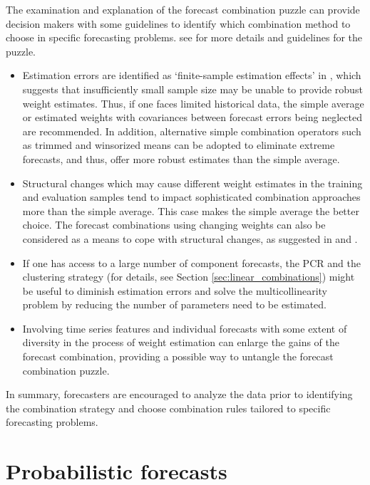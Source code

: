 \documentclass[11pt]{article}
\begin{document}
The examination and explanation of the forecast combination puzzle can provide decision makers with some guidelines to identify which combination method to choose in specific forecasting problems. {\color{red}see \cite{Blanc2016-sn} for more details and guidelines for the puzzle.}
\begin{itemize}
  \item Estimation errors are identified as `finite-sample estimation effects' in \cite{Smith2009-wd}, which suggests that insufficiently small sample size may be unable to provide robust weight estimates. Thus, if one faces limited historical data, the simple average or estimated weights with covariances between forecast errors being neglected are recommended. In addition, alternative simple combination operators such as trimmed and winsorized means can be adopted to eliminate extreme forecasts, and thus, offer more robust estimates than the simple average.
  \item Structural changes which may cause different weight estimates in the training and evaluation samples tend to impact sophisticated combination approaches more than the simple average. This case makes the simple average the better choice. The forecast combinations using changing weights can also be considered as a means to cope with structural changes, as suggested in \cite{Diebold1987-go} and \cite{Deutsch1994-ob}.
  \item If one has access to a large number of component forecasts, the PCR and the clustering strategy (for details, see Section \ref{sec:linear_combinations}) might be useful to diminish estimation errors and solve the multicollinearity problem by reducing the number of parameters need to be estimated.
  \item Involving time series features and individual forecasts with some extent of diversity in the process of weight estimation can enlarge the gains of the forecast combination, providing a possible way to untangle the forecast combination puzzle.
\end{itemize}
In summary, forecasters are encouraged to analyze the data prior to identifying the combination strategy and choose combination rules tailored to specific forecasting problems.


\section{Probabilistic forecasts}
\label{sec:probabilistic_forecasts}
\end{document}
